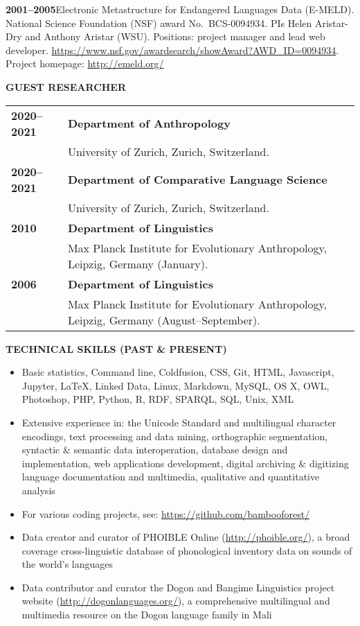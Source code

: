 \documentclass[11pt]{article}
\newcommand{\hangpara}{
 \setlength{\parindent}{0in} %
 \hangindent=0.42in %
}
\begin{document}
\vskip 6pt
\hangpara
{\bf 2001--2005}\hspace{1ex}Electronic Metastructure for Endangered Languages Data (E-MELD). National Science Foundation (NSF) award No.\ BCS-0094934. PIs Helen Aristar-Dry and Anthony Aristar (WSU). Positions: project manager and lead web developer. \url{https://www.nsf.gov/awardsearch/showAward?AWD_ID=0094934}. Project homepage: \url{http://emeld.org/}


\vskip 20pt
\begin{flushleft}
{\bf GUEST RESEARCHER}
\end{flushleft}
\begin{tabular}{lp{5.5in}}
\bf 2020--2021	& {\bf Department of Anthropology} \\
& University of Zurich, Zurich, Switzerland. \\
\bf 2020--2021	& {\bf Department of Comparative Language Science} \\
& University of Zurich, Zurich, Switzerland. \\
\bf 2010	& {\bf Department of Linguistics}\\
& Max Planck Institute for Evolutionary Anthropology, Leipzig, Germany (January).  \\
\bf 2006	& {\bf Department of Linguistics}\\
& Max Planck Institute for Evolutionary Anthropology, Leipzig, Germany (August--September).  \\
\end{tabular}

\vskip 24pt
\begin{flushleft}
{\bf TECHNICAL SKILLS (PAST \& PRESENT)}
\end{flushleft}
\begin{itemize}
\item Basic statistics, Command line, Coldfusion, CSS, Git, HTML, Javascript, Jupyter, \LaTeX, Linked Data, Linux, Markdown, MySQL, OS X, OWL, Photoshop, PHP, Python, R, RDF, SPARQL, SQL, Unix, XML
\item Extensive experience in: the Unicode Standard and multilingual character encodings, text processing and data mining, orthographic segmentation, syntactic \& semantic data interoperation, database design and implementation, web applications development, digital archiving \& digitizing language documentation and multimedia, qualitative and quantitative analysis
\item For various coding projects, see: \url{https://github.com/bambooforest/}
\item Data creator and curator of PHOIBLE Online (\url{http://phoible.org/}), a broad coverage cross-linguistic database of phonological inventory data on sounds of the world's languages
\item Data contributor and curator the Dogon and Bangime Linguistics project website (\url{http://dogonlanguages.org/}), a comprehensive multilingual and multimedia resource on the Dogon language family in Mali
\end{itemize}
\end{document}
